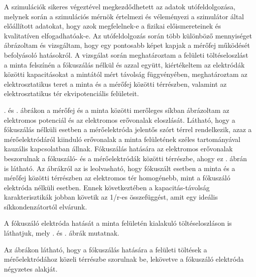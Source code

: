 A szimulációk sikeres végeztével megkezdődhetett az adatok utófeldolgozása, melynek során a szimulációs mérnök értelmezi és véleményezi a szimulátor által előállított adatokat, hogy azok megfelelnek-e a fizikai előismereteinek és kvalitatíven elfogadhatóak-e. Az utófeldolgozás során több különböző mennyiséget ábrázoltam és vizsgáltam, hogy egy pontosabb képet kapjak a mérőfej működését befolyásoló hatásokról. A vizsgálat során meghatároztam a felületi töltéseloszlást a minta felszínén a fókuszálás nélkül és azzal együtt, kiértékeltem az elektródák közötti kapacitásokat a mintától mért távolság függvényében, meghatároztam az elektrosztatikus teret a minta és a mérőfej közötti térrészben, valamint az elektrosztatikus tér ekvipotenciális felületeit.


. és . ábrákon a mérőfej és a minta közötti merőleges síkban ábrázoltam az elektromos potenciál és az elektromos erővonalak eloszlását. Látható, hogy a fókuszálás nélküli esetben a mérőelektróda jelentős szórt térrel rendelkezik, azaz a mérőelektródáról kiinduló erővonalak a minta felületének széles tartományával kauzális kapcsolatban állnak. Fókuszálás hatására az elektromos erővonalak beszorulnak a fókuszáló- és a mérőelektródák közötti térrészbe, ahogy ez . ábrán is látható. Az ábrákról az is leolvasható, hogy fókuszált esetben a minta és a mérőfej közötti térrészben az elektromos tér homogénebb, mint a fókuszáló elektróda nélküli esetben. Ennek következtében a kapacitás-távolság karakterisztikák jobban követik az 1/r-es összefüggést, amit egy ideális síkkondenzátortól elvárunk.

A fókuszáló elektróda hatását a minta felületén kialakuló töltéseloszláson is láthatjuk, mely . és . ábrák mutatnak.


Az ábrákon látható, hogy a fókuszálás hatására a felületi töltések a mérőelektródához közeli térrészbe szorulnak be, lekövetve a fókuszáló elektróda négyzetes alakját.

